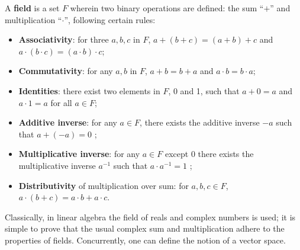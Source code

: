 \begin{definition}[Field]\label{def:field}
	A \textbf{field} is a set $F$ wherein two binary operations are defined: the sum ``$+$'' and multiplication ``$\cdot$'', following certain rules:

\begin{itemize}
	\item \textbf{Associativity}: for three $a,b,c$ in $F$, $a+(b+c) = (a+b)+c$ and $a\cdot (b\cdot c) = (a\cdot b) \cdot c$;
	\item \textbf{Commutativity}: for any $a,b$ in $F$, $a+b = b+a$ and $a\cdot b = b\cdot a$;
	\item \textbf{Identities}: there exist two elements in $F$, 0 and 1, such that $a + 0 = a$ and $a\cdot 1 = a$ for all $a\in F$;
	\item \textbf{Additive inverse}: for any $a\in F$, there exists the additive inverse $-a$ such that $a + (-a) = 0$ ;
	\item \textbf{Multiplicative inverse}: for any $a\in F$ except $0$ there exists the multiplicative inverse $a^{-1}$ such that $a\cdot a^{-1} = 1$ ;
	\item \textbf{Distributivity} of multiplication over sum: for $a,b,c\in F$, $a\cdot (b + c) = a\cdot b + a\cdot c$.
\end{itemize}
\end{definition}

	Classically, in linear algebra the field of reals and complex numbers is used; it is simple to prove that the usual complex sum and multiplication adhere to the properties of fields. Concurrently, one can define the notion of a vector space.

